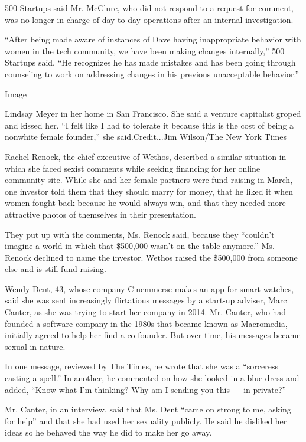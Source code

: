500 Startups said Mr. McClure, who did not respond to a request for
comment, was no longer in charge of day-to-day operations after an
internal investigation.

``After being made aware of instances of Dave having inappropriate
behavior with women in the tech community, we have been making changes
internally,'' 500 Startups said. ``He recognizes he has made mistakes
and has been going through counseling to work on addressing changes in
his previous unacceptable behavior.''

Image

Lindsay Meyer in her home in San Francisco. She said a venture
capitalist groped and kissed her. ``I felt like I had to tolerate it
because this is the cost of being a nonwhite female founder,'' she
said.Credit...Jim Wilson/The New York Times

Rachel Renock, the chief executive of
\href{https://www.wethos.co/\#get-involved-section}{Wethos}, described a
similar situation in which she faced sexist comments while seeking
financing for her online community site. While she and her female
partners were fund-raising in March, one investor told them that they
should marry for money, that he liked it when women fought back because
he would always win, and that they needed more attractive photos of
themselves in their presentation.

They put up with the comments, Ms. Renock said, because they ``couldn't
imagine a world in which that \$500,000 wasn't on the table anymore.''
Ms. Renock declined to name the investor. Wethos raised the \$500,000
from someone else and is still fund-raising.

Wendy Dent, 43, whose company Cinemmerse makes an app for smart watches,
said she was sent increasingly flirtatious messages by a start-up
adviser, Marc Canter, as she was trying to start her company in 2014.
Mr. Canter, who had founded a software company in the 1980s that became
known as Macromedia, initially agreed to help her find a co-founder. But
over time, his messages became sexual in nature.

In one message, reviewed by The Times, he wrote that she was a
``sorceress casting a spell.'' In another, he commented on how she
looked in a blue dress and added, ``Know what I'm thinking? Why am I
sending you this --- in private?''

Mr. Canter, in an interview, said that Ms. Dent ``came on strong to me,
asking for help'' and that she had used her sexuality publicly. He said
he disliked her ideas so he behaved the way he did to make her go away.

